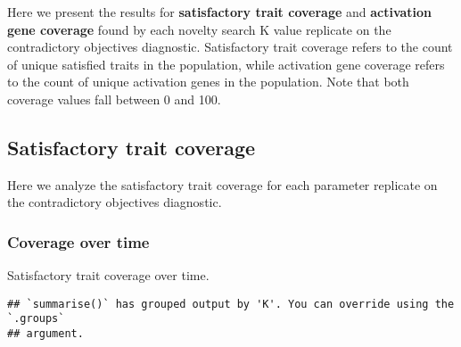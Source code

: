 \documentclass[]{book}
\newenvironment{Shaded}{\begin{snugshade}}{\end{snugshade}}
\newcommand{\DataTypeTok}[1]{\textcolor[rgb]{0.13,0.29,0.53}{#1}}
\newcommand{\KeywordTok}[1]{\textcolor[rgb]{0.13,0.29,0.53}{\textbf{#1}}}
\newcommand{\NormalTok}[1]{#1}
\newcommand{\OperatorTok}[1]{\textcolor[rgb]{0.81,0.36,0.00}{\textbf{#1}}}
\newcommand{\StringTok}[1]{\textcolor[rgb]{0.31,0.60,0.02}{#1}}
\begin{document}
Here we present the results for \textbf{satisfactory trait coverage} and \textbf{activation gene coverage} found by each novelty search K value replicate on the contradictory objectives diagnostic.
Satisfactory trait coverage refers to the count of unique satisfied traits in the population, while activation gene coverage refers to the count of unique activation genes in the population.
Note that both coverage values fall between 0 and 100.

\hypertarget{satisfactory-trait-coverage-5}{%
\subsection{Satisfactory trait coverage}\label{satisfactory-trait-coverage-5}}

Here we analyze the satisfactory trait coverage for each parameter replicate on the contradictory objectives diagnostic.

\hypertarget{coverage-over-time-17}{%
\subsubsection{Coverage over time}\label{coverage-over-time-17}}

Satisfactory trait coverage over time.

\begin{Shaded}
\end{Shaded}

\begin{verbatim}
## `summarise()` has grouped output by 'K'. You can override using the `.groups`
## argument.
\end{verbatim}
\end{document}
